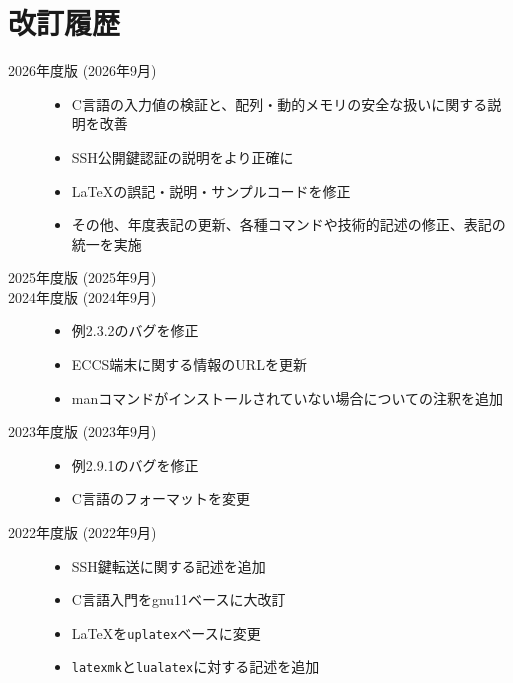 \section*{改訂履歴}

\noindent
\begin{description}
    \item [2026年度版 (2026年9月)] \mbox{}
       \begin{itemize}
           \item C言語の入力値の検証と、配列・動的メモリの安全な扱いに関する説明を改善
           \item SSH公開鍵認証の説明をより正確に
           \item \LaTeX の誤記・説明・サンプルコードを修正
           \item その他、年度表記の更新、各種コマンドや技術的記述の修正、表記の統一を実施
       \end{itemize}


    \item [2025年度版 (2025年9月)] \mbox{}

    \item [2024年度版 (2024年9月)] \mbox{}

       \begin{itemize}
           \item 例2.3.2のバグを修正
           \item ECCS端末に関する情報のURLを更新
           \item manコマンドがインストールされていない場合についての注釈を追加
       \end{itemize}


    \item [2023年度版 (2023年9月)] \mbox{}

       \begin{itemize}
           \item 例2.9.1のバグを修正
           \item C言語のフォーマットを変更
       \end{itemize}


    \item [2022年度版 (2022年9月)] \mbox{}

          \begin{itemize}
              \item SSH鍵転送に関する記述を追加
              \item C言語入門をgnu11ベースに大改訂
              \item \LaTeX を\texttt{uplatex}ベースに変更
              \item \texttt{latexmk}と\texttt{lualatex}に対する記述を追加
          \end{itemize}


\end{description}
